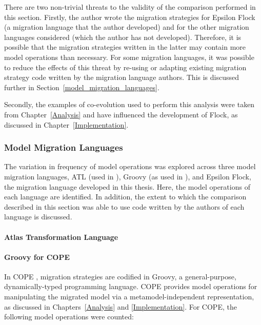 There are two non-trivial threats to the validity of the comparison performed in this section. Firstly, the author wrote the migration strategies for Epsilon Flock (a migration language that the author developed) and for the other migration languages considered (which the author has not developed). Therefore, it is possible that the migration strategies written in the latter may contain more model operations than necessary. For some migration languages, it was possible to reduce the effects of this threat by re-using or adapting existing migration strategy code written by the migration language authors. This is discussed further in Section~\ref{model_migration_languages}.

Secondly, the examples of co-evolution used to perform this analysis were taken from Chapter~\ref{Analysis} and have influenced the development of Flock, as discussed in Chapter~\ref{Implementation}.  %


\subsubsection{Model Migration Languages}
\label{subsec:model_migration_languages}
The variation in frequency of model operations was explored across three model migration languages, ATL (used in  \cite{cicchetti,garces}), Groovy (as used in \cite{cope}), and Epsilon Flock, the migration language developed in this thesis. Here, the model operations of each language are identified. In addition, the extent to which the comparison described in this section was able to use code written by the authors of each language is discussed.


\paragraph{Atlas Transformation Language}


\paragraph{Groovy for COPE}
In COPE \cite{cope}, migration strategies are codified in Groovy, a general-purpose, dynamically-typed programming language. COPE provides model operations for manipulating the migrated model via a metamodel-independent representation, as discussed in Chapters~\ref{Analysis} and \ref{Implementation}. For COPE, the following model operations were counted:

